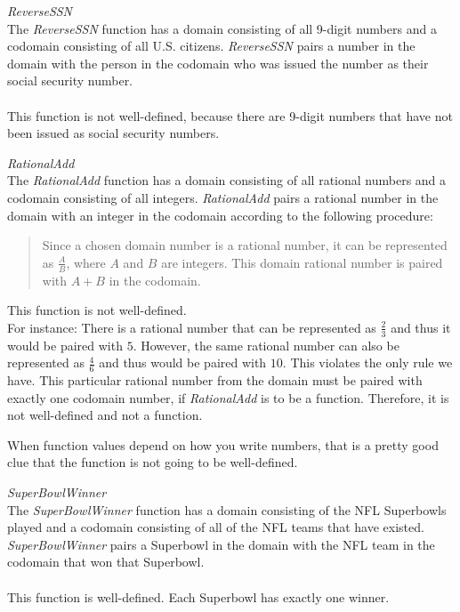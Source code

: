 \documentclass{ximera}
\begin{document}
\begin{example} \textit{ReverseSSN} \\
The \textit{ReverseSSN} function has a domain consisting of all 9-digit numbers and a codomain consisting of all U.S. citizens.  \textit{ReverseSSN} pairs a number in the domain with the person in the codomain who was issued the number as their social security number. 
\\ \\ 
This function is not well-defined, because there are 9-digit numbers that have not been issued as social security numbers.
\end{example}


\begin{example} \textit{RationalAdd} \\
The \textit{RationalAdd} function has a domain consisting of all rational numbers and a codomain consisting of all integers.  \textit{RationalAdd} pairs a rational number in the domain with an integer in the codomain according to the following procedure: \\ 
\begin{quote}
Since a chosen domain number is a rational number, it can be represented as $\tfrac{A}{B}$, where $A$ and $B$ are integers. This domain rational number is paired with $A+B$ in the codomain.
\end{quote}
 
This function is not well-defined.  \\

For instance: There is a rational number that can be represented as $\tfrac{2}{3}$ and thus it would be paired with $5$.  However, the same rational number can also be represented as $\tfrac{4}{6}$ and thus would be paired with $10$.  This violates the only rule we have.  This particular rational number from the domain must be paired with exactly one codomain number, if \textit{RationalAdd} is to be a function. Therefore, it is not well-defined and not a function.

\begin{warning}
When function values depend on how you write numbers, that is a pretty good clue that the function is not going to be well-defined.
\end{warning}
\end{example}



\begin{example} \textit{SuperBowlWinner}  \\
The \textit{SuperBowlWinner} function has a domain consisting of the NFL Superbowls played and a codomain consisting of all of the NFL teams that have existed.  \textit{SuperBowlWinner} pairs a Superbowl in the domain with the NFL team in the codomain that won that Superbowl.  \\ 
\\
This function is well-defined. Each Superbowl has exactly one winner.
\end{example}
\end{document}
